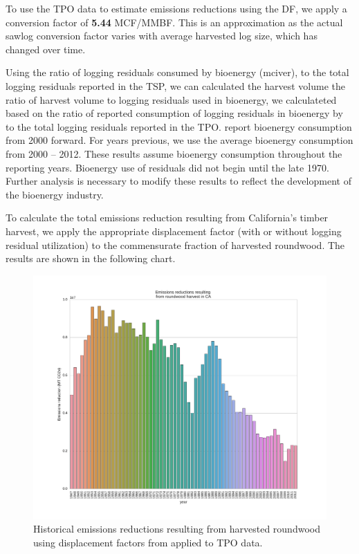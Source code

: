 \documentclass[a4paper]{article}
\begin{document}
To use the TPO data to estimate emissions reductions using the DF, we apply a
conversion factor of \textbf{5.44} MCF/MMBF. This is an approximation as the
actual sawlog conversion factor varies with average harvested log size, which has changed over time.  


Using the ratio of logging residuals consumed by bioenergy (mciver), to the total logging residuals reported in the TSP, we can calculated the harvest volume the ratio of harvest volume to logging residuals used in bioenergy,
we calculateted 
based on the ratio of reported consumption of logging residuals in
bioenergy by \citeauthor{Mciver2012} to the total logging residuals reported
in the TPO. \citeauthor{Mciver2012} report bioenergy consumption from 2000
forward. For years previous, we use the average bioenergy consumption
from 2000 -- 2012. These results assume bioenergy consumption
throughout the reporting years. Bioenergy use of residuals did not
begin until the late 1970. Further analysis is necessary to modify
these results to reflect the development of the bioenergy industry.

To calculate the total emissions reduction resulting from California's
timber harvest, we apply the appropriate displacement factor (with or
without logging residual utilization) to the commensurate fraction of
harvested roundwood. The results are shown in the following chart.

\begin{figure}[htb]
\centering
\includegraphics[width=\textwidth]{./graphics/ann_hh_em_reduc.pdf}
\caption{Historical emissions reductions resulting from harvested roundwood using displacement factors from \citep{Sathre2010} applied to TPO data.\label{em_reduc_hist}}
\end{figure}
\end{document}

